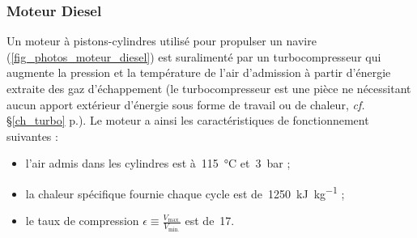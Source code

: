 \subsubsection{Moteur Diesel}
\label{exo_cycle_moteur_diesel}

	Un moteur à pistons-cylindres utilisé pour propulser un navire (\cref{fig_photos_moteur_diesel}) est suralimenté par un turbocompresseur qui augmente la pression et la température de l’air d’admission à partir d’énergie extraite des gaz d’échappement (le turbocompresseur est une pièce ne nécessitant aucun apport extérieur d’énergie sous forme de travail ou de chaleur, \textit{cf.} \S\ref{ch_turbo} p.\pageref{ch_turbo}). Le moteur a ainsi les caractéristiques de fonctionnement suivantes :
	\begin{itemize}
		\item l’air admis dans les cylindres est à~\SI{115}{\degreeCelsius} et~\SI{3}{\bar} ;
		\item la chaleur spécifique fournie chaque cycle est de~\SI{1250}{\kilo\joule\per\kilogram} ;
		\item le taux de compression $\epsilon \equiv \frac{V_\text{max.}}{V_\text{min.}}$ est de~\num{17}.
	\end{itemize}
	
